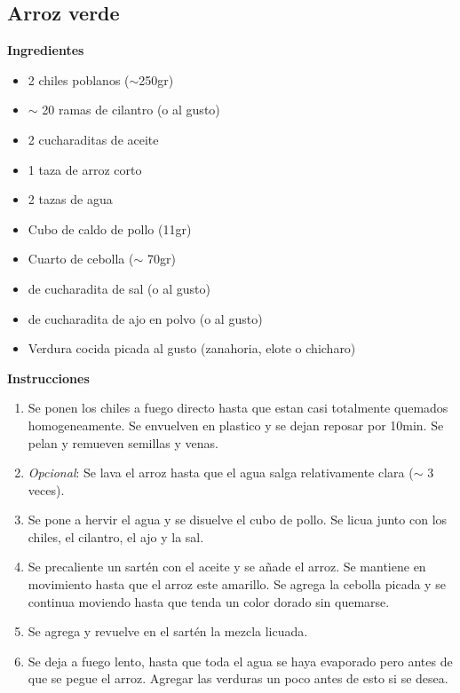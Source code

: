 \subsection{Arroz verde}
\textbf{Ingredientes}
\begin{itemize}
\item 2 chiles poblanos ($\sim$250gr)
\item $\sim$ 20 ramas de cilantro (o al gusto)
\item 2 cucharaditas de aceite
\item 1 taza de arroz corto
\item 2 tazas de agua
\item Cubo de caldo de pollo (11gr)
\item Cuarto de cebolla ($\sim$ 70gr)
\item {} de cucharadita de sal (o al gusto)
\item {} de cucharadita de ajo en polvo (o al gusto)
\item Verdura cocida picada al gusto (zanahoria, elote o chicharo)
\end{itemize}

\textbf{Instrucciones}
\begin{enumerate}
\item Se ponen los chiles a fuego directo hasta que estan casi totalmente quemados homogeneamente. Se envuelven en plastico y se dejan reposar por 10min. Se pelan y remueven semillas y venas.
\item \textit{Opcional}: Se lava el arroz hasta que el agua salga relativamente clara ($\sim$ 3 veces).
\item Se pone a hervir el agua y se disuelve el cubo de pollo. Se licua junto con los chiles, el cilantro, el ajo y la sal.
\item Se precaliente un sartén con el aceite y se añade el arroz. Se mantiene en movimiento hasta que el arroz este amarillo. Se agrega la cebolla picada y se continua moviendo hasta que tenda un color dorado sin quemarse.
\item Se agrega y revuelve en el sart\'en la mezcla licuada.
\item Se deja a fuego lento, hasta que toda el agua se haya evaporado pero antes de que se pegue el arroz. Agregar las verduras un poco antes de esto si se desea.
\end{enumerate}
